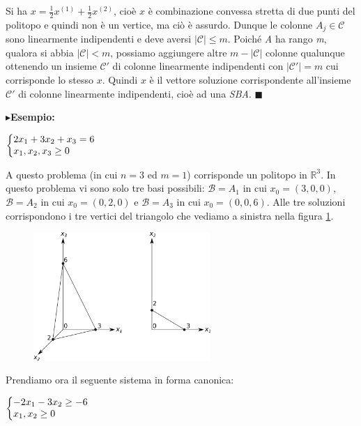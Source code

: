 \documentclass[11pt]{book}
\makeatletter
\newenvironment{sistema}%
{\left\lbrace\begin{array}{@{}l@{}}}%
{\end{array}\right.}
\makeatother
\begin{document}
Si ha $x = \frac{1}{2}x^{(1)}+\frac{1}{2}x^{(2)}$, cio\`e $x$ \`e
combinazione convessa stretta di due punti del politopo e quindi non
\`e un vertice, ma ci\`o \`e assurdo. Dunque le colonne $A_j \in
\mathcal{C}$ sono linearmente indipendenti e deve aversi
$|\mathcal{C}| \leq m$. Poich\'e {\em A} ha rango {\em m}, qualora si
abbia $|\mathcal{C}| < m$, possiamo aggiungere altre $m-|\mathcal{C}|$
colonne qualunque ottenendo un insieme $\mathcal{C}'$ di colonne
linearmente indipendenti con $|\mathcal{C}'|=m$ cui corrisponde lo
stesso $x$. Quindi $x$ \`e il vettore soluzione corrispondente
all'insieme $\mathcal{C}'$ di colonne linearmente indipendenti, cio\`e
ad una {\em SBA}. $\blacksquare$
\newline
\vspace{11pt}

$\blacktriangleright${\bf Esempio:} 
\begin{center}
$\begin{sistema}
2x_1 + 3x_2 + x_3 = 6 \\
x_1, x_2, x_3 \geq 0  
\end{sistema}$
\end{center}

A questo problema (in cui $n=3$ ed $m=1$) corrisponde un politopo in
$\mathbb{R}^3$. In questo problema vi sono solo tre basi possibili:
$\mathcal{B} = A_1$ in cui $x_0 = (3, 0, 0)$, $\mathcal{B} = A_2$ in
cui $x_0 = (0, 2, 0)$ e $\mathcal{B} = A_3$ in cui $x_0 = (0, 0, 6)$.
Alle tre soluzioni corrispondono i tre vertici del triangolo che
vediamo a sinistra nella figura \ref{triangolo}.

\begin{figure}[h!]
  \centering
  \includegraphics[width=0.6\textwidth]{images/triangolo.png}
  \label{triangolo}
\end{figure}

Prendiamo ora il seguente sistema in forma canonica:

\begin{center}
$\begin{sistema}
-2x_1 - 3x_2 \geq -6 \\
x_1, x_2 \geq 0  
\end{sistema}$
\end{center}
\end{document}
